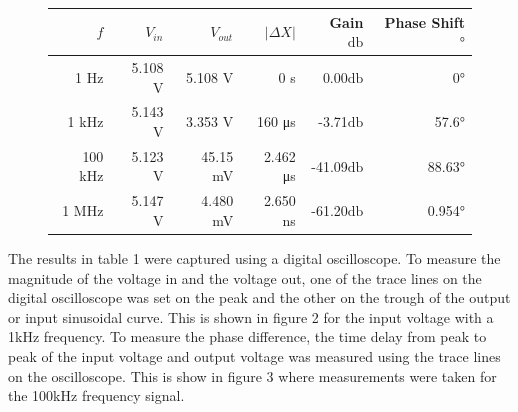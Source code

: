 \documentclass{article}
\begin{document}
\begin{figure}[H]
\centering
\begin{tabular}{ | r | r | r | r | r | r | }
	\hline
	$f$ & $V_{in}$ & $V_{out}$ & $|\Delta X|$ & Gain $\si{\decibel}$ & Phase Shift $\si{\degree}$ \\ \hline
	1 \si{\hertz} & 5.108 \si{\volt} & 5.108 \si{\volt} & 0 \si{\second} & 0.00$\si{\decibel}$ & 0$\si{\degree}$ \\ \hline
	1 \si{\kilo\hertz} & 5.143 \si{\volt} & 3.353 \si{\volt} & 160 \si{\micro\second} & -3.71$\si{\decibel}$ & 57.6$\si{\degree}$ \\ \hline
	100 \si{\kilo\hertz} & 5.123 \si{\volt} & 45.15 \si{\milli\volt} & 2.462 \si{\micro\second} & -41.09$\si{\decibel}$ & 88.63$\si{\degree}$ \\ \hline
	1 \si{\mega\hertz} & 5.147 \si{\volt} & 4.480 \si{\milli\volt} & 2.650 \si{\nano\second} & -61.20$\si{\decibel}$ & 0.954$\si{\degree}$ \\ \hline 
	
\end{tabular}
\end{figure}

The results in table 1 were captured using a digital oscilloscope. To measure the magnitude of the voltage in and the voltage out, one of the trace lines on the digital oscilloscope was set on the peak and the other on the trough of the output or input sinusoidal curve. This is shown in figure 2 for the input voltage with a 1kHz frequency. To measure the phase difference, the time delay from peak to peak of the input voltage and output voltage was measured using the trace lines on the oscilloscope. This is show in figure 3 where measurements were taken for the 100kHz frequency signal.
\end{document}
